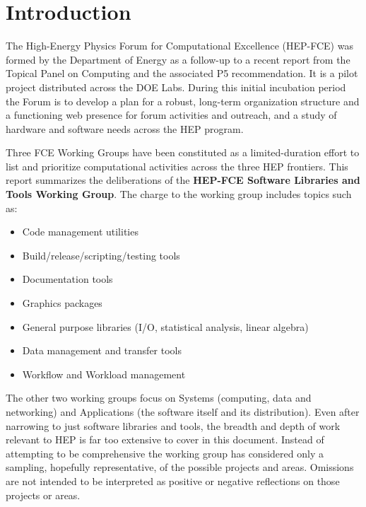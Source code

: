 \section{Introduction}

The High-Energy Physics Forum for Computational Excellence (HEP-FCE)
was formed by the Department of Energy as a follow-up to a recent
report from the Topical Panel on Computing\cite{topicalpanel} and the
associated P5 recommendation\cite{p5}.
%
It is a  pilot project distributed across the DOE Labs.  
%
During this initial incubation period the Forum is to develop a plan
for a robust, long-term organization structure and a functioning web
presence for forum activities and outreach, and a study of hardware
and software needs across the HEP program.

Three FCE Working Groups have been constituted as a limited-duration
effort to list and prioritize computational activities across the
three HEP frontiers.  This report summarizes the deliberations of the
\textbf{HEP-FCE Software Libraries and Tools Working Group}. The
charge to the working group includes topics such as:

\begin{itemize}
\item Code management utilities
\item Build/release/scripting/testing tools
\item Documentation tools
\item Graphics packages
\item General purpose libraries (I/O, statistical analysis, linear algebra)
\item  Data management and transfer tools
\item  Workflow and Workload management
\end{itemize}

The other two working groups focus on Systems (computing, data and networking)
and Applications (the software itself and its distribution).   
%
Even after narrowing to just software libraries and tools, the breadth and
depth of work relevant to HEP is far too extensive to cover in this
document.  Instead of attempting to be comprehensive the working group
has considered only a sampling, hopefully representative, of the
possible projects and areas.  Omissions are not intended to be
interpreted as positive or negative reflections on those projects or
areas.

